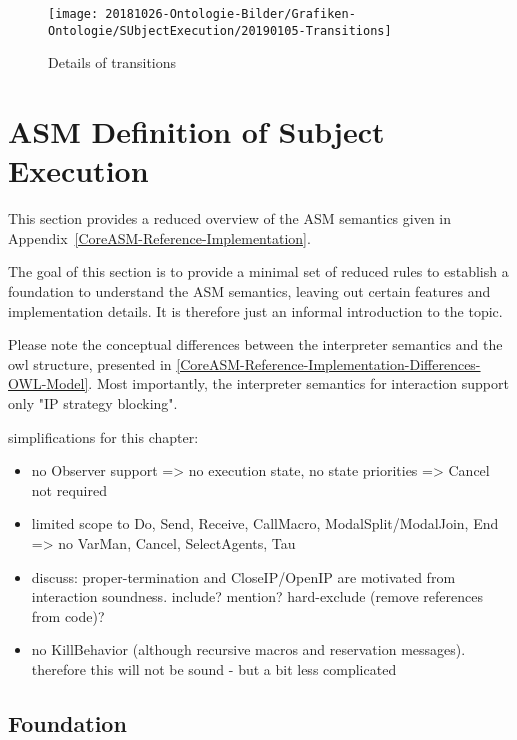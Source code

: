 \begin{figure}[htbp]
	\centering
	\texttt{[image: 20181026-Ontologie-Bilder/Grafiken-Ontologie/SUbjectExecution/20190105-Transitions]}
	\caption[Details of transitions]{Details of transitions}
	\label{fig:20190105-transitions}
\end{figure}


\section{ASM Definition of Subject Execution}



This section provides a reduced overview of the ASM semantics given in Appendix~\ref{CoreASM-Reference-Implementation}.

The goal of this section is to provide a minimal set of reduced rules to establish a foundation to understand the ASM semantics,
leaving out certain features and implementation details.
It is therefore just an informal introduction to the topic.

Please note the conceptual differences between the interpreter semantics and the owl structure, presented in \ref{CoreASM-Reference-Implementation-Differences-OWL-Model}.
Most importantly, the interpreter semantics for interaction support only "IP strategy blocking".

simplifications for this chapter:
\begin{itemize}
	\item no Observer support => no execution state, no state priorities => Cancel not required
	\item limited scope to Do, Send, Receive, CallMacro, ModalSplit/ModalJoin, End => no VarMan, Cancel, SelectAgents, Tau
	\item discuss: proper-termination and CloseIP/OpenIP are motivated from interaction soundness. include? mention? hard-exclude (remove references from code)?
	\item no KillBehavior (although recursive macros and reservation messages). therefore this will not be sound - but a bit less complicated
\end{itemize}

\subsection{Foundation}

